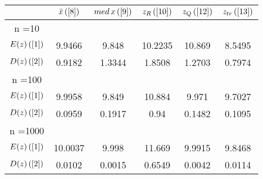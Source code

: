 \begin{tabular}{|c|c|c|c|c|c|}
\hline
 & $\bar{x} \, (\ref{8})$ & $med \, x \, (\ref{9})$ & $z_R \, (\ref{10})$ & $z_Q \, (\ref{12})$ & $z_{tr} \, (\ref{13})$ \\
\hline
n =10 &  &  &  &  & \\
\hline
$E(z) \, (\ref{1})$ & 9.9466 & 9.848 & 10.2235 & 10.869 & 8.5495\\
\hline
$D(z) \, (\ref{2})$ & 0.9182 & 1.3344 & 1.8508 & 1.2703 & 0.7974\\
\hline
n =100 &  &  &  &  & \\
\hline
$E(z) \, (\ref{1})$ & 9.9958 & 9.849 & 10.884 & 9.971 & 9.7027\\
\hline
$D(z) \, (\ref{2})$ & 0.0959 & 0.1917 & 0.94 & 0.1482 & 0.1095\\
\hline
n =1000 &  &  &  &  & \\
\hline
$E(z) \, (\ref{1})$ & 10.0037 & 9.998 & 11.669 & 9.9915 & 9.8468\\
\hline
$D(z) \, (\ref{2})$ & 0.0102 & 0.0015 & 0.6549 & 0.0042 & 0.0114\\
\hline
\end{tabular}